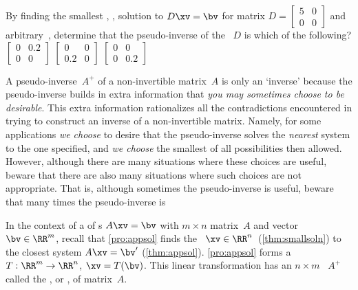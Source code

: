 \begin{activity}
By finding the smallest , , solution to \(D\xv=\bv\) for matrix \(D=\begin{bmatrix} 5&0\\0&0 \end{bmatrix}\) and arbitrary~\bv, determine that the pseudo-inverse of the ~\(D\) is which of the following?
{\(\begin{bmatrix} 0&0.2\\0&0 \end{bmatrix}\)}
{\(\begin{bmatrix} 0&0\\0.2&0 \end{bmatrix}\)}
{\(\begin{bmatrix} 0&0\\0&0.2 \end{bmatrix}\)}
\end{activity}




A pseudo-inverse~\(A^+\) of a non-invertible matrix~\(A\) is only an `inverse' because the pseudo-inverse builds in extra information that  \emph{you may sometimes choose to be desirable}.
This extra information rationalizes all the contradictions encountered in trying to construct an inverse of a non-invertible matrix.  
Namely, for some applications \emph{we choose} to desire that the pseudo-inverse solves the \emph{nearest}  system to the one specified, and \emph{we choose} the smallest of all possibilities then allowed.
However, although there are many situations where these choices are useful, beware that there are also many situations where such choices are not appropriate.
That is, although sometimes the pseudo-inverse is useful, beware that  many times the pseudo-inverse is 


\begin{theorem} \label{thm:lsqlt}
In the context of a  of s \(A\xv=\bv\) with \(m\times n\) matrix~\(A\) and vector~\(\bv\in\RR^m\), recall that \cref{pro:appsol} finds the ~\(\xv\in\RR^n\)\ (\cref{thm:smallsoln}) to the closest  system \(A\xv=\bv'\) (\cref{thm:appsol}).
\cref{pro:appsol} forms a  \(T:\RR^m\to\RR^n\), \(\xv=T(\bv)\).
This linear transformation has an \(n\times m\) ~\(A^+\) called the , or , of matrix~\(A\).
\end{theorem}


